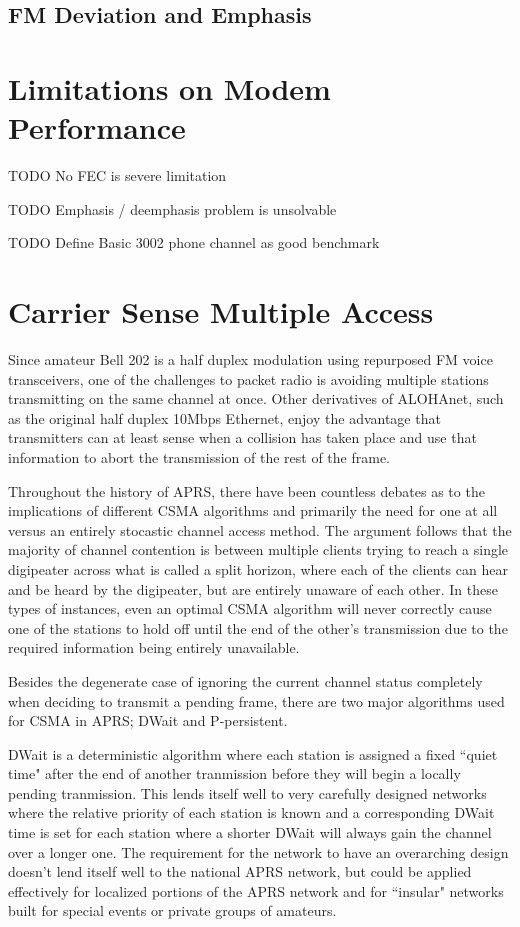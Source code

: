 \documentclass[12pt,letterpaper]{article}
\begin{document}
\subsection{FM Deviation and Emphasis}

\section{Limitations on Modem Performance}

TODO No FEC is severe limitation

TODO Emphasis / deemphasis problem is unsolvable

TODO Define Basic 3002 phone channel as good benchmark

\section{Carrier Sense Multiple Access}
\label{sec:bell202csma}

Since amateur Bell 202 is a half duplex modulation using repurposed 
FM voice transceivers, 
one of the challenges to packet radio is avoiding multiple stations
transmitting on the same channel at once. 
Other derivatives of ALOHAnet, 
such as the original half duplex 10Mbps Ethernet, 
enjoy the advantage that transmitters can
at least sense when a collision has taken place 
and use that information to abort the transmission of the rest of the frame.

Throughout the history of APRS, there have been 
countless debates as to the implications
of different CSMA algorithms and primarily 
the need for one at all versus an entirely 
stocastic channel access method. The argument follows that the majority of 
channel contention is between multiple clients trying to reach a single digipeater
across what is called a split horizon, where each of the clients can hear and be heard
by the digipeater, but are entirely unaware of each other. In these types of instances,
even an optimal CSMA algorithm will never correctly cause one of the stations to hold 
off until the end of the other's transmission due to the required information being
entirely unavailable.

Besides the degenerate case of ignoring the current channel status completely when 
deciding to transmit a pending frame, there are two major algorithms used for CSMA
in APRS;
DWait and P-persistent.

DWait is a deterministic algorithm where each station is assigned a fixed
``quiet time" after the end of another tranmission before they will begin a locally
pending tranmission. This lends itself well to very carefully designed networks
where the relative priority of each station is known and a corresponding DWait time
is set for each station where a shorter DWait will always gain the channel over a longer
one. The requirement for the network to have an overarching design doesn't lend itself
well to the national APRS network, but could be applied effectively for localized 
portions of the APRS network and for ``insular" networks built for special events or
private groups of amateurs.
\end{document}
